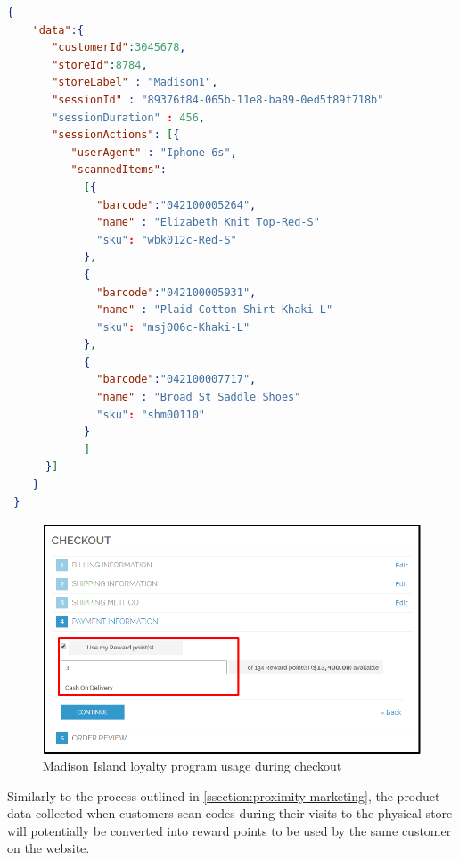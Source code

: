 \vspace{0.5cm}
\begin{lstlisting}[language=json,firstnumber=1]
  {
    "data":{
       "customerId":3045678,
       "storeId":8784,
       "storeLabel" : "Madison1",
       "sessionId" : "89376f84-065b-11e8-ba89-0ed5f89f718b"
       "sessionDuration" : 456,
       "sessionActions": [{
          "userAgent" : "Iphone 6s",
          "scannedItems":
            [{
              "barcode":"042100005264",
              "name" : "Elizabeth Knit Top-Red-S"
              "sku": "wbk012c-Red-S"    
            },
            {
              "barcode":"042100005931",
              "name" : "Plaid Cotton Shirt-Khaki-L"
              "sku": "msj006c-Khaki-L"    
            },
            {
              "barcode":"042100007717",
              "name" : "Broad St Saddle Shoes"
              "sku": "shm00110"    
            }
            ]
      }]
    }
 }
  \end{lstlisting}
\vspace{0.5cm}


\vspace{0.5cm}
\begin{figure}[H]
  \centering
    \includegraphics[width=12cm]{images/loyalty-reward-points.png}
  \caption{Madison Island loyalty program usage during checkout}
  \label{fig:loyalty-points}
\end{figure}
\vspace{0.5cm}

Similarly to the process outlined in \ref{ssection:proximity-marketing}, the product data collected when customers scan codes during their visits to the physical store will potentially be converted into reward points to be used by the same customer on the website.  

